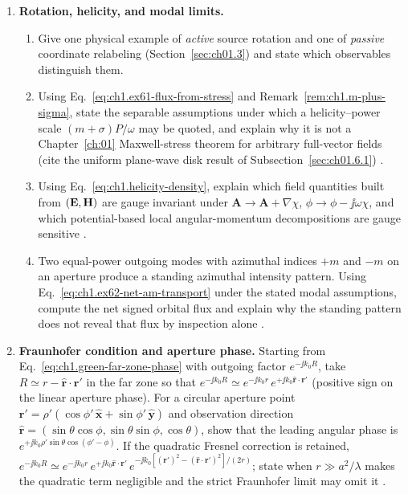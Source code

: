 \begin{enumerate}
\item \textbf{Rotation, helicity, and modal limits.}
\begin{enumerate}[label=(\alph*)]
\item Give one physical example of \emph{active} source rotation and one of \emph{passive} coordinate relabeling (Section~\ref{sec:ch01.3}) and state which observables distinguish them.
\item Using Eq.~\eqref{eq:ch1.ex61-flux-from-stress} and Remark~\ref{rem:ch1.m-plus-sigma}, state the separable assumptions under which a helicity--power scale $(m+\sigma)P/\omega$ may be quoted, and explain why it is not a Chapter~\ref{ch:01} Maxwell-stress theorem for arbitrary full-vector fields (cite the uniform plane-wave disk result of Subsection~\ref{sec:ch01.6.1}) \cite{stratton1941,allen1992}.
\item Using Eq.~\eqref{eq:ch1.helicity-density}, explain which field quantities built from $(\mathbf{E},\mathbf{H})$ are gauge invariant under $\mathbf{A}\to\mathbf{A}+\nabla\chi$, $\phi\to\phi-\jj\omega\chi$, and which potential-based local angular-momentum decompositions are gauge sensitive \cite{belinfante1940,jackson1999}.
\item Two equal-power outgoing modes with azimuthal indices $+m$ and $-m$ on an aperture produce a standing azimuthal intensity pattern. Using Eq.~\eqref{eq:ch1.ex62-net-am-transport} under the stated modal assumptions, compute the net signed orbital flux and explain why the standing pattern does not reveal that flux by inspection alone \cite{allen1992,beth1936}.
\end{enumerate}

\item \textbf{Fraunhofer condition and aperture phase.}
Starting from Eq.~\eqref{eq:ch1.green-far-zone-phase} with outgoing factor $e^{-\jj k_0 R}$, take $R\simeq r-\hat{\mathbf{r}}\cdot\mathbf{r}'$ in the far zone so that $e^{-\jj k_0 R}\simeq e^{-\jj k_0 r}\,e^{+\jj k_0\hat{\mathbf{r}}\cdot\mathbf{r}'}$ (positive sign on the linear aperture phase). For a circular aperture point $\mathbf{r}'=\rho'(\cos\phi'\,\hat{\mathbf{x}}+\sin\phi'\,\hat{\mathbf{y}})$ and observation direction $\hat{\mathbf{r}}=(\sin\theta\cos\phi,\sin\theta\sin\phi,\cos\theta)$, show that the leading angular phase is $e^{+\jj k_0\rho'\sin\theta\cos(\phi'-\phi)}$. If the quadratic Fresnel correction is retained,
$e^{-\jj k_0 R}\simeq e^{-\jj k_0 r}\,e^{+\jj k_0\hat{\mathbf{r}}\cdot\mathbf{r}'}\,e^{-\jj k_0[(\mathbf{r}')^2-(\hat{\mathbf{r}}\cdot\mathbf{r}')^2]/(2r)}$;
state when $r\gg a^2/\lambda$ makes the quadratic term negligible and the strict Fraunhofer limit may omit it \cite{bornwolf1999,silver1949,stratton1941}.


\end{enumerate}
